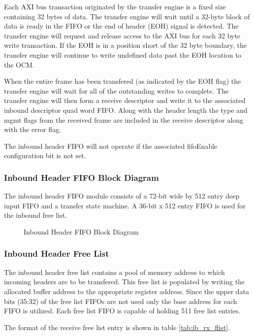 \documentclass[11pt]{article}
\begin{document}
Each AXI bus transaction originated by the transfer engine is a fixed size containing 32 bytes of data. 
The transfer engine will wait until a 32-byte block of data is ready in the FIFO or the end
of header (EOH) signal is detected. The transfer engine will request and release access to the AXI bus for each 32 byte
write transaction. If the EOH is in a position short of the 32 byte boundary, the transfer engine will continue to write
undefined data past the EOH location to the OCM.

When the entire frame has been transfered (as indicated by the EOH flag) the transfer engine will 
wait for all of the outstanding writes to complete. The transfer engine will then form a receive descriptor and 
write it to the associated inbound descriptor quad word FIFO. Along with the header length the type and mgmt flags 
from the received frame are included in the receive descriptor along with the error flag.

The inbound header FIFO will not operate if the associated fifoEnable configuration bit is not set.

\subsubsection{Inbound Header FIFO Block Diagram}

The inbound header FIFO module consists of a 72-bit wide by 512 entry deep input FIFO and a transfer state machine. A 36-bit x 512 entry FIFO is used
for the inbound free list. 

\begin{figure}[H]
   \centering
   \caption{Inbound Header FIFO Block Diagram}
   \label{fig:ib_head_block}
\end{figure}

\subsubsection{Inbound Header Free List}

The inbound header free list contains a pool of memory address to which incoming headers are to be transfered.
This free list is populated by writing the allocated buffer address to the appropriate register address.
Since the upper data bits (35:32) of the free list FIFOs are not used only the base address for each FIFO is utilized. 
Each free list FIFO is capable of holding 511 free list entries.

The format of the receive free list entry is shown in table \ref{tab:ib_rx_flist}.
\end{document}
